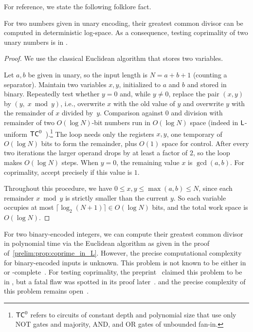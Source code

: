 For reference, we state the following folklore fact.

\begin{proposition}
	\label{prelim:prop:coprime_in_L}
	For two numbers given in unary encoding,
	their greatest common divisor can be computed
	in deterministic log-space.
	As a consequence, testing coprimality
	of two unary numbers is in \LOGSPACE.
\end{proposition}
\begin{proof}	
	We use the classical Euclidean algorithm that stores two variables.
	
	Let $a,b$ be given in unary, so the input length is $N = a + b + 1$ (counting a
	separator). Maintain two variables $x,y$, initialized to $a$ and $b$ and stored
	in binary. Repeatedly test whether $y = 0$ and, while $y \neq 0$, replace the
	pair $(x,y)$ by $(y,\; x \bmod y)$, i.e., overwrite $x$ with the old value of
	$y$ and overwrite $y$ with the remainder of $x$ divided by~$y$. Comparison
	against $0$ and division with remainder of two $O(\log N)$-bit numbers run in
	$O(\log N)$ space (indeed in $\textsf{L}$-uniform $\textup{\textsf{TC}}^0$~\cite{DBLP:journals/ita/ChiuDL01,DBLP:journals/jcss/HesseAB02,DBLP:journals/jcss/HesseAB14}).\footnote{$\textup{\textsf{TC}}^0$ refers to circuits of constant depth and polynomial size
		that use only {\sc NOT} gates and majority, {\sc AND}, and {\sc OR} gates of unbounded fan-in.} 
	The loop needs only
	the registers $x,y$, one temporary of $O(\log N)$ bits to form the remainder,
	plus $O(1)$ space for control. After every two iterations the larger operand
	drops by at least a factor of $2$, so the loop makes $O(\log N)$ steps. When
	$y = 0$, the remaining value $x$ is $\gcd(a,b)$. For coprimality, accept
	precisely if this value is $1$.
	
	Throughout this procedure, we have $0 \le x,y \le \max(a,b) \le N$, since each
	remainder $x \bmod y$ is strictly smaller than the current $y$. So each variable
	occupies at most $\lceil \log_2(N+1)\rceil \in O(\log N)$ bits, and the total
	work space is $O(\log N)$.
\end{proof}

For two binary-encoded integers, we can compute their greatest common divisor
in polynomial time via the Euclidean algorithm as given in the proof of~\cref{prelim:prop:coprime_in_L}.
However, the precise computational complexity for binary-encoded inputs
is unknown. This problem is not known to be either in \NC or \PTIME-complete~\cite{DBLP:journals/ipl/Sorenson10}.
For testing coprimality, the preprint~\cite[Thm.~1]{DBLP:journals/eccc/ECCC-TR98-009} claimed this problem to be in \NC, but a fatal flaw was spotted in its proof later~\cite{DBLP:journals/eccc/ECCC-TR98-009-comment}.
and the precise complexity of this problem remains open~\cite{DBLP:journals/endm/Sedjelmaci11}.

